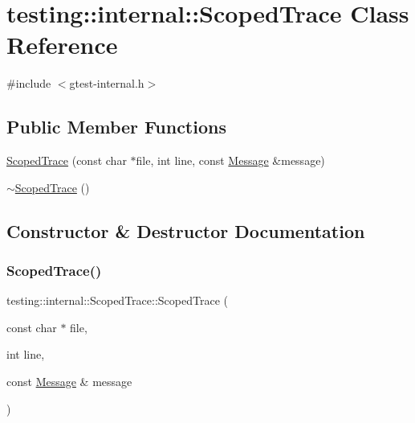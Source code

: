 \hypertarget{classtesting_1_1internal_1_1_scoped_trace}{}\section{testing\+::internal\+::Scoped\+Trace Class Reference}
\label{classtesting_1_1internal_1_1_scoped_trace}


{\ttfamily \#include $<$gtest-\/internal.\+h$>$}

\subsection*{Public Member Functions}
\begin{DoxyCompactItemize}
\item 
\mbox{\hyperlink{classtesting_1_1internal_1_1_scoped_trace_ab965d7010bbbc82c1bef6ebf8748bede}{Scoped\+Trace}} (const char $\ast$file, int line, const \mbox{\hyperlink{classtesting_1_1_message}{Message}} \&message)
\item 
\mbox{\hyperlink{classtesting_1_1internal_1_1_scoped_trace_a658c7c098ff48337058bfa2ccab65881}{$\sim$\+Scoped\+Trace}} ()
\end{DoxyCompactItemize}


\subsection{Constructor \& Destructor Documentation}
\mbox{\label{classtesting_1_1internal_1_1_scoped_trace_ab965d7010bbbc82c1bef6ebf8748bede}} 
\subsubsection{\texorpdfstring{ScopedTrace()}{ScopedTrace()}}
{\footnotesize\ttfamily testing\+::internal\+::\+Scoped\+Trace\+::\+Scoped\+Trace (\begin{DoxyParamCaption}\item[{const char $\ast$}]{file,  }\item[{int}]{line,  }\item[{const \mbox{\hyperlink{classtesting_1_1_message}{Message}} \&}]{message }\end{DoxyParamCaption})}

